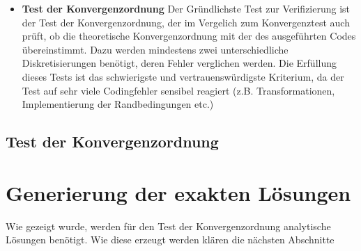 \begin{itemize}
	\item \textbf{Test der Konvergenzordnung}
	Der Gründlichste Test zur Verifizierung ist der Test der Konvergenzordnung, der im Vergelich zum Konvergenztest auch prüft, ob die theoretische Konvergenzordnung mit der des ausgeführten Codes übereinstimmt. Dazu werden mindestens zwei unterschiedliche Diskretisierungen benötigt, deren Fehler verglichen werden. Die Erfüllung dieses Tests ist das schwierigste und vertrauenswürdigste Kriterium, da der Test auf sehr viele Codingfehler sensibel reagiert (z.B. Transformationen, Implementierung der Randbedingungen etc.)
\end{itemize}

\subsection{Test der Konvergenzordnung}

\section{Generierung der exakten Lösungen}
Wie gezeigt wurde, werden für den Test der Konvergenzordnung analytische Lösungen benötigt. Wie diese erzeugt werden klären die nächsten Abschnitte
